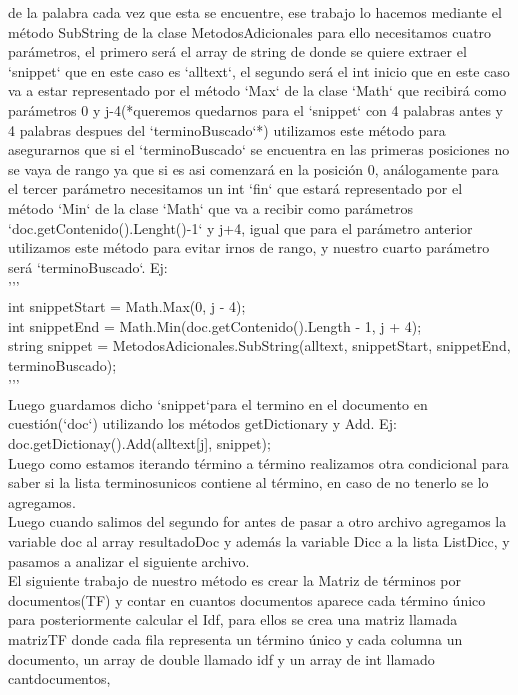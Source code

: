 \documentclass{article}
\begin{document}
 de la palabra cada vez que esta se encuentre, ese trabajo lo hacemos mediante el método SubString de la clase MetodosAdicionales
 para ello necesitamos
cuatro parámetros, el primero será el array de string de donde se quiere extraer el `snippet`
que en este caso es `alltext`, el segundo será el int inicio que en este caso va a estar 
representado por el método `Max` de la clase `Math` que recibirá como parámetros 0
y j-4(*queremos quedarnos para el `snippet` con 4 palabras antes y 4 palabras despues del
`terminoBuscado`*) utilizamos este método para asegurarnos que si el `terminoBuscado` se
encuentra en las primeras posiciones no se vaya de rango ya que si es asi comenzará en 
la posición 0, análogamente para el tercer parámetro necesitamos un int `fin` que estará 
representado por el método `Min` de la clase `Math` que va a recibir como parámetros 
`doc.getContenido().Lenght()-1` y j+4, igual que para el parámetro anterior utilizamos
este método para evitar irnos de rango, y nuestro cuarto parámetro será `terminoBuscado`. Ej:\\
'''\\
int snippetStart = Math.Max(0, j - 4);\\
int snippetEnd = Math.Min(doc.getContenido().Length - 1, j + 4);\\
string snippet = MetodosAdicionales.SubString(alltext, snippetStart, snippetEnd, terminoBuscado);\\
'''\\
Luego guardamos dicho `snippet`para el termino en el documento en cuestión(`doc`) utilizando los métodos
getDictionary y Add. Ej:\\
doc.getDictionay().Add(alltext[j], snippet);\\
Luego como estamos iterando término a término realizamos otra condicional para saber si la lista terminosunicos contiene 
al término, en caso de no tenerlo se lo agregamos.\\
Luego cuando salimos del segundo for antes de pasar a otro archivo agregamos la variable doc al array resultadoDoc y además 
la variable Dicc a la lista ListDicc, y pasamos a analizar el siguiente archivo.\\
El siguiente trabajo de nuestro método es crear la Matriz de términos por documentos(TF) y contar en cuantos documentos aparece 
cada término único para posteriormente calcular el Idf, para ellos se crea una matriz llamada matrizTF donde cada fila representa 
un término único y cada columna un documento, un array de double llamado idf y un array de int llamado cantdocumentos, 
\end{document}
